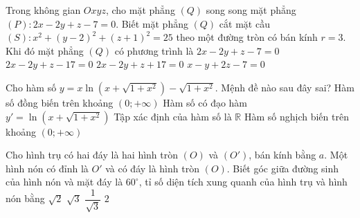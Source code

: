 \begin{ex}%
Trong không gian $O x y z$, cho mặt phẳng $(Q)$ song song mặt phẳng $(P)\colon 2 x-2 y+z-7=0$. Biết mặt phẳng $(Q)$ cắt mặt cầu $(S)\colon x^2+(y-2)^2+(z+1)^2=25$ theo một đường tròn có bán kính $r=3$. Khi đó mặt phẳng $(Q)$ có phương trình là
\choice
{$2 x-2 y+z-7=0$}
{$2 x-2 y+z-17=0$}
{\True $2 x-2 y+z+17=0$}
{$x-y+2 z-7=0$}

\end{ex}
\begin{ex}%
{\vspace{-0.5cm}
}

\end{ex}
\begin{ex}%
Cho hàm số $y=x \ln \left(x+\sqrt{1+x^2}\right)-\sqrt{1+x^2}$. Mệnh đề nào sau đây sai?
\choice
{Hàm số đồng biến trên khoảng $(0;+\infty)$}
{Hàm số có đạo hàm $y'=\ln \left(x+\sqrt{1+x^2}\right)$}
{Tập xác định của hàm số là $\mathbb{R}$}
{\True Hàm số nghịch biến trên khoảng $(0;+\infty)$}

\end{ex}
\begin{ex}%
Cho hình trụ có hai đáy là hai hình tròn $(O)$ và $\left(O'\right)$, bán kính bằng $a$. Một hình nón có đỉnh là $O'$ và có đáy là hình tròn $(O)$. Biết góc giữa đường sinh của hình nón và mặt đáy là $60^{\circ}$, tỉ số diện tích xung quanh của hình trụ và hình nón bằng
\choice
{$\sqrt{2}$}
{\True $\sqrt{3}$}
{$\dfrac{1}{\sqrt{3}}$}
{$2$}

\end{ex}
